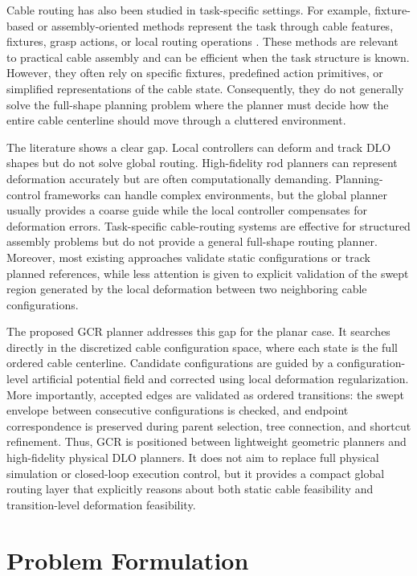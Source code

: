 \documentclass{pas}
\begin{document}
Cable routing has also been studied in task-specific settings. For example,
fixture-based or assembly-oriented methods represent the task through cable
features, fixtures, grasp actions, or local routing operations
\cite{jin2022robotic,waltersson2022planning,keipour2022deformable}.
These methods are relevant to practical cable assembly and can be efficient when
the task structure is known. However, they often rely on specific fixtures,
predefined action primitives, or simplified representations of the cable state.
Consequently, they do not generally solve the full-shape planning problem where
the planner must decide how the entire cable centerline should move through a
cluttered environment.

The literature shows a clear gap. Local controllers can deform and
track DLO shapes but do not solve global routing. High-fidelity rod planners can
represent deformation accurately but are often computationally demanding.
Planning-control frameworks can handle complex environments, but the global
planner usually provides a coarse guide while the local controller compensates
for deformation errors. Task-specific cable-routing systems are effective for
structured assembly problems but do not provide a general full-shape routing
planner. Moreover, most existing approaches validate static configurations or
track planned references, while less attention is given to explicit validation of
the swept region generated by the local deformation between two neighboring
cable configurations.

The proposed GCR planner addresses this gap for the planar case. It searches
directly in the discretized cable configuration space, where each state is the full
ordered cable centerline. Candidate configurations are guided by a
configuration-level artificial potential field and corrected using local deformation
regularization. More importantly, accepted edges are validated as ordered
transitions: the swept envelope between consecutive configurations is checked,
and endpoint correspondence is preserved during parent selection, tree
connection, and shortcut refinement. Thus, GCR is positioned between
lightweight geometric planners and high-fidelity physical DLO planners. It does
not aim to replace full physical simulation or closed-loop execution control, but
it provides a compact global routing layer that explicitly reasons about both
static cable feasibility and transition-level deformation feasibility.




\section{Problem Formulation}
\label{sec:formulation}
\end{document}
